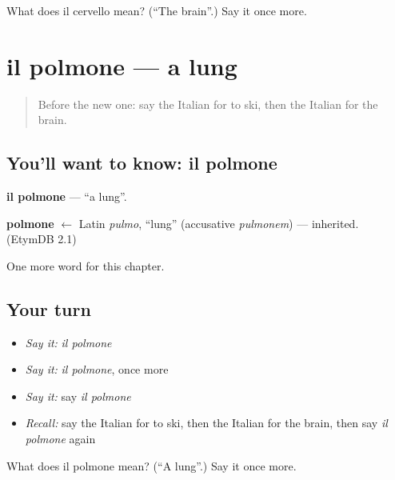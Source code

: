 \begin{tcolorbox}[breakable,colback=teal!4,colframe=teal!35!black,title={Before you move on}]
What does il cervello mean? (\textquotedblleft{}The brain\textquotedblright{}.) Say it once more.
\end{tcolorbox}
\section[il polmone]{il polmone — a lung}

\label{lesson:IT-C151-polmone}



\begin{quote}
Before the new one: say the Italian for to ski, then the Italian for the brain.
\end{quote}

\subsection*{You'll want to know: il polmone}
\textbf{il polmone} — \textquotedblleft{}a lung\textquotedblright{}.

\begin{cousinweb}
\textbf{polmone} $\leftarrow$ Latin \emph{pulmo}, \textquotedblleft{}lung\textquotedblright{} (accusative \emph{pulmonem}) — inherited. (EtymDB 2.1)
\end{cousinweb}

\begin{grammarlens}[title={What you've built}]
One more word for this chapter.
\end{grammarlens}

\subsection*{Your turn}
\begin{itemize}
\raggedright
  \item \emph{Say it:} \emph{il polmone}
  \item \emph{Say it:} \emph{il polmone}, once more
  \item \emph{Say it:} say \emph{il polmone}
  \item \emph{Recall:} say the Italian for to ski, then the Italian for the brain, then say \emph{il polmone} again
\end{itemize}

\begin{tcolorbox}[breakable,colback=teal!4,colframe=teal!35!black,title={Before you move on}]
What does il polmone mean? (\textquotedblleft{}A lung\textquotedblright{}.) Say it once more.
\end{tcolorbox}
